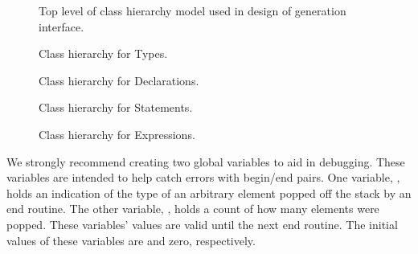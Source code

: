 \begin{figure}
\caption{\label{fig:if_hier_top}
  Top level of class hierarchy model used in design of generation interface.}
  \begin{center}
  \end{center}
\end{figure}
\begin{figure}
\centering
\caption{\label{fig:if_hier_type}
  Class hierarchy for Types.}
\end{figure}
\begin{figure}
\centering
\caption{\label{fig:if_hier_decl}
  Class hierarchy  for Declarations.}
\end{figure}
\begin{figure}
\centering
\caption{\label{fig:if_hier_stmt}
  Class hierarchy for Statements.}
\end{figure}
\begin{figure}
\centering
\caption{\label{fig:if_hier_exp}
  Class hierarchy for Expressions.}
  \setlength{\epsfxsize}{\textwidth}
\end{figure}

We strongly recommend creating two global variables to aid in
debugging.  These variables are intended to help catch errors with
begin/end pairs.  One variable, , holds an
indication of the type of an arbitrary element popped off the stack by
an end routine.  The other variable, , holds a count
of how many elements were popped.  These variables' values are valid
until the next end routine.  The initial values of these variables are
 and zero, respectively.

\label{sec:tables}

